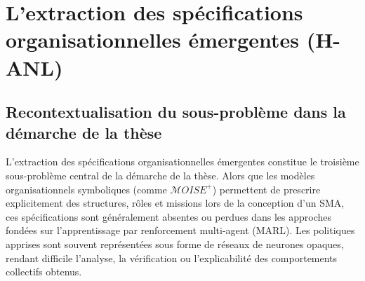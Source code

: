 





\section{L'extraction des spécifications organisationnelles émergentes (H-ANL)}

\subsection*{Recontextualisation du sous-problème dans la démarche de la thèse}

L’extraction des spécifications organisationnelles émergentes constitue le troisième sous-problème central de la démarche de la thèse. Alors que les modèles organisationnels symboliques (comme $\mathcal{M}OISE^+$) permettent de prescrire explicitement des structures, rôles et missions lors de la conception d’un SMA, ces spécifications sont généralement absentes ou perdues dans les approches fondées sur l’apprentissage par renforcement multi-agent (MARL). Les politiques apprises sont souvent représentées sous forme de réseaux de neurones opaques, rendant difficile l’analyse, la vérification ou l’explicabilité des comportements collectifs obtenus.

